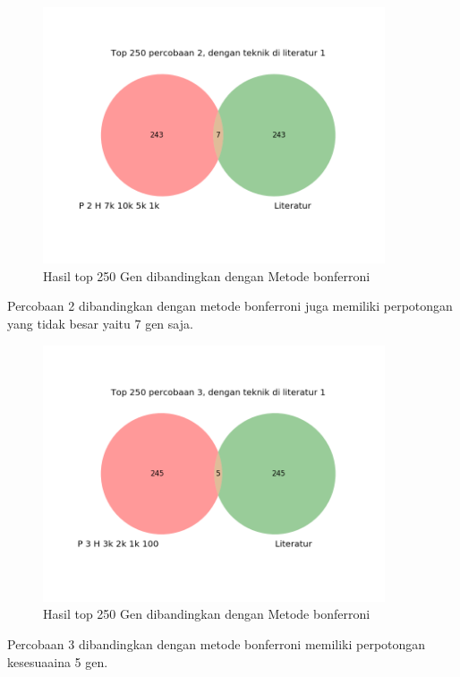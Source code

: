 \begin{figure}
	\centering
	\includegraphics[width=0.9\textwidth]
		{pics/bon2.png}
	\caption{Hasil top 250 Gen dibandingkan dengan Metode bonferroni}
	\label{fig:bon1}
\end{figure}

Percobaan 2 dibandingkan dengan metode bonferroni juga memiliki perpotongan yang tidak besar yaitu 7 gen saja.

\begin{figure}
	\centering
	\includegraphics[width=0.9\textwidth]
		{pics/bon3.png}
	\caption{Hasil top 250 Gen dibandingkan dengan Metode bonferroni}
	\label{fig:bon3}
\end{figure}

Percobaan 3 dibandingkan dengan metode bonferroni memiliki perpotongan kesesuaaina 5 gen.



